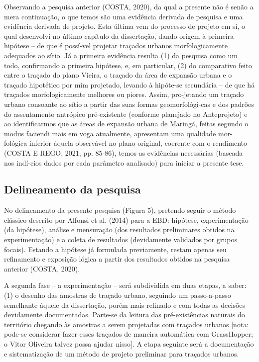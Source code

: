 \documentclass[twoside, 12pt, english,italian,latin,greek,french,spanish,brazil]{book}
\begin{document}
        Observando a pesquisa anterior (COSTA, 2020), da qual a presente não é senão a mera continuação, o que temos são uma evidência derivada de pesquisa  e uma evidência derivada de projeto.  Esta última vem do processo de projeto em si, o qual desenvolvi no último capítulo da dissertação, dando origem à primeira hipótese – de que é possí-vel projetar traçados urbanos morfologicamente adequados ao sítio. Já a primeira evidência resulta (1) da pesquisa como um todo, confirmando a primeira hipótese, e, em particular, (2) do comparativo feito entre o traçado do plano Vieira, o traçado da área de expansão urbana e o traçado hipotético por mim projetado, levando à hipóte-se secundária – de que há traçados morfologicamente melhores ou piores. Assim, pro-jetando um traçado urbano consoante ao sítio a partir das suas formas geomorfológi-cas e dos padrões do assentamento antrópico pré-existente (conforme planejado no Anteprojeto) e ao identificarmos que as áreas de expansão urbana de Maringá, feitas segundo o modus faciendi mais em voga atualmente, apresentam uma qualidade mor-fológica inferior àquela observável no plano original, coerente com o rendimento (COSTA E REGO, 2021, pp. 85-86), temos as evidências necessárias (baseada nos indí-cios dados por cada parâmetro analisado) para iniciar a presente tese. 

    \subsection{Delineamento da pesquisa}

        No delineamento da presente pesquisa (Figura 5), pretendo seguir o método clássico descrito por Alfonsi et al. (2014) para a EBD: hipótese, experimentação (da hipótese), análise e mensuração (dos resultados preliminares obtidos na experimentação) e a coleta de resultados (devidamente validados por grupos focais). Estando a hipótese já formulada previamente, restam apenas seu refinamento e exposição lógica a partir dos resultados obtidos na pesquisa anterior (COSTA, 2020).

        A segunda fase – a experimentação – será subdividida em duas etapas, a saber: (1) o desenho das amostras de traçado urbano, seguindo um passo-a-passo semelhante àquele da dissertação, porém mais refinado e com todas as decisões devidamente documentadas. Parte-se da leitura das pré-existências naturais do território chegando às amostras a serem projetadas com traçados urbanos [nota: pode-se considerar fazer esses traçados de maneira automática com GrassHopper; o Vitor Oliveira talvez possa ajudar nisso]. A etapa seguinte será a documentação e sistematização de um método de projeto preliminar para traçados urbanos. 
\end{document}
